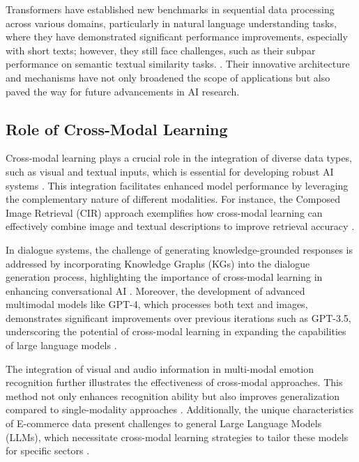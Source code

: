 Transformers have established new benchmarks in sequential data processing across various domains, particularly in natural language understanding tasks, where they have demonstrated significant performance improvements, especially with short texts; however, they still face challenges, such as their subpar performance on semantic textual similarity tasks. \cite{ginzburg2021selfsuperviseddocumentsimilarityranking}. Their innovative architecture and mechanisms have not only broadened the scope of applications but also paved the way for future advancements in AI research.



\subsection{Role of Cross-Modal Learning} \label{subsec:Role of Cross-Modal Learning}

Cross-modal learning plays a crucial role in the integration of diverse data types, such as visual and textual inputs, which is essential for developing robust AI systems \cite{liu2024visual}. This integration facilitates enhanced model performance by leveraging the complementary nature of different modalities. For instance, the Composed Image Retrieval (CIR) approach exemplifies how cross-modal learning can effectively combine image and textual descriptions to improve retrieval accuracy \cite{jang2024visualdeltageneratorlarge}. 



In dialogue systems, the challenge of generating knowledge-grounded responses is addressed by incorporating Knowledge Graphs (KGs) into the dialogue generation process, highlighting the importance of cross-modal learning in enhancing conversational AI \cite{chaudhuri2021groundingdialoguesystemsknowledge}. Moreover, the development of advanced multimodal models like GPT-4, which processes both text and images, demonstrates significant improvements over previous iterations such as GPT-3.5, underscoring the potential of cross-modal learning in expanding the capabilities of large language models \cite{GPT-4Techn0}.



The integration of visual and audio information in multi-modal emotion recognition further illustrates the effectiveness of cross-modal approaches. This method not only enhances recognition ability but also improves generalization compared to single-modality approaches \cite{zhou2023leveragingtcntransformereffective}. Additionally, the unique characteristics of E-commerce data present challenges to general Large Language Models (LLMs), which necessitate cross-modal learning strategies to tailor these models for specific sectors \cite{li2023ecomgptinstructiontuninglargelanguage}.



